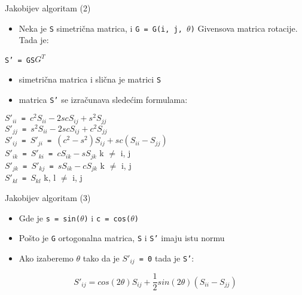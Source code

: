 \documentclass[serbian]{beamer}
\newcommand\tab[1][1cm]{\hspace*{#1}}
\begin{document}
\begin{frame}{Jakobijev algoritam (2)}

\begin{itemize}
	\item Neka je \texttt{S} simetrična matrica, i \texttt{G = G(i, j, $\theta$)} Givensova matrica rotacije. Tada je:
\end{itemize}

	 \begin{center}
 		\texttt{S' = GS$G^{T}$} \\
 	\end{center}
	
\begin{itemize}
	\item simetrična matrica i slična je matrici \texttt{S}
	\item matrica \texttt{S'} se izračunava sledećim formulama:
\end{itemize}

	\begin{center}
 		\texttt{$S'_{ii}$ = $c^2S_{ii} - 2scS_{ij} + s^2S_{jj}$} \\
		\texttt{$S'_{jj}$ = $s^2S_{ii} - 2scS_{ij} + c^2S_{jj}$} \\
		\texttt{$S'_{ij}$ = $S'_{ji}$ = $(c^2 - s^2)S_{ij} + sc(S_{ii} - S_{jj})$} \\
		\texttt{$S'_{ik}$ = $S'_{ki}$ = $cS_{ik} - sS_{jk}$} \tab[1cm] k $\neq$ i, j \\
		\texttt{$S'_{jk}$ = $S'_{kj}$ = $sS_{ik} - cS_{jk}$} \tab[1cm] k $\neq$ i, j  \\
		\texttt{$S'_{kl}$ = $S_{kl}$} \tab[3cm] k, l $\neq$ i, j  
 	\end{center}

\end{frame}

\begin{frame}{Jakobijev algoritam (3)}

\begin{itemize}
	\item Gde je \texttt{s = sin($\theta$)} i \texttt{c = cos($\theta$)}
	\item Pošto je \texttt{G} ortogonalna matrica, \texttt{S} i \texttt{S'} imaju istu normu
	\item Ako izaberemo $\theta$ tako da je \texttt{$S'_{ij}$ = 0} tada je \texttt{S'}:
\end{itemize}

	\begin{equation}
		S'_{ij} = cos(2\theta)S_{ij} + \dfrac{1}{2}sin(2\theta)(S_{ii} - S_{jj})
	\end{equation}

\end{frame}
\end{document}
